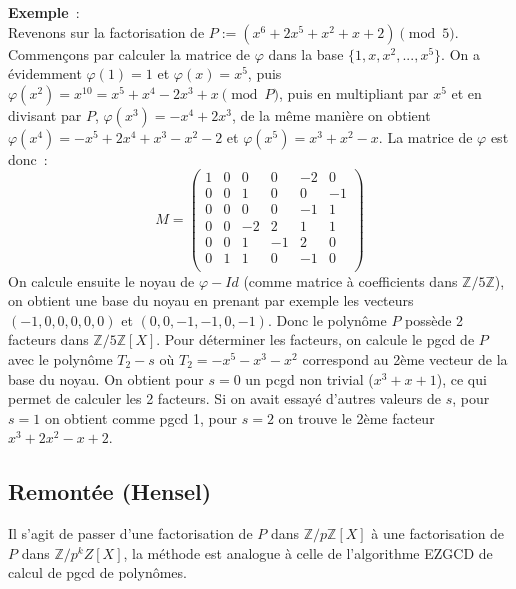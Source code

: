 \documentclass[a4paper,11pt]{book}
\begin{document}
\begin{giacjshere}
{\bf Exemple}~:\\
Revenons sur la factorisation de $P:=(x^6+2x^5+x^2+x+2) \pmod 5$.
Commençons par calculer la matrice de $\varphi$ dans la base
$\{ 1,x,x^2,...,x^5\}$. On a évidemment $\varphi(1)=1$ et
$\varphi(x)=x^5$, puis $\varphi(x^2)=x^{10}=x^5+x^4-2x^3+x \pmod P$,
puis en multipliant par $x^5$ et en divisant par $P$,
$\varphi(x^3)=-x^4+2x^3$, de la même manière on obtient 
$\varphi(x^4)=-x^5+2x^4+x^3-x^2-2$ et $\varphi(x^5)=x^3+x^2-x$.
La matrice de $\varphi$ est donc~:
\[ M=\left( 
\begin{array}{cccccc}
1& 0& 0 &0 &-2&0\\
0& 0& 1 &0 &0 &-1\\
0& 0& 0 &0 &-1&1\\
0& 0& -2&2 & 1&1\\
0& 0& 1 &-1& 2&0\\
0& 1& 1 &0 &-1&0\\
\end{array}
\right)\]
On calcule ensuite le noyau de $\varphi-Id$ (comme matrice à coefficients
dans $\mathbb{Z}/5\mathbb{Z}$), on obtient une
base du noyau en prenant par exemple les vecteurs $(-1,0,0,0,0,0)$
et $(0,0,-1,-1,0,-1)$. Donc le polynôme $P$ possède 2 facteurs dans
$\mathbb{Z}/5\mathbb{Z}[X]$. Pour déterminer les facteurs, on calcule le pgcd de $P$
avec le polynôme $T_2-s$ où $T_2=-x^5-x^3-x^2$ correspond au 2ème
vecteur de la base du noyau. On obtient pour $s=0$ un pcgd non trivial
($x^3+x+1$), ce qui permet de calculer les 2 facteurs. Si on avait
essayé d'autres valeurs de $s$, pour $s=1$ on obtient comme pgcd 1, pour
$s=2$ on trouve le 2ème facteur $x^3+2x^2-x+2$.

\subsection{Remontée (Hensel)} 
Il s'agit de passer d'une factorisation de $P$ dans $\mathbb{Z}/p\mathbb{Z}[X]$ à une
factorisation de $P$ dans $\mathbb{Z}/p^k Z[X]$, la méthode est analogue à celle
de l'algorithme EZGCD de calcul de pgcd de polynômes.


\end{giacjshere}
\end{document}
